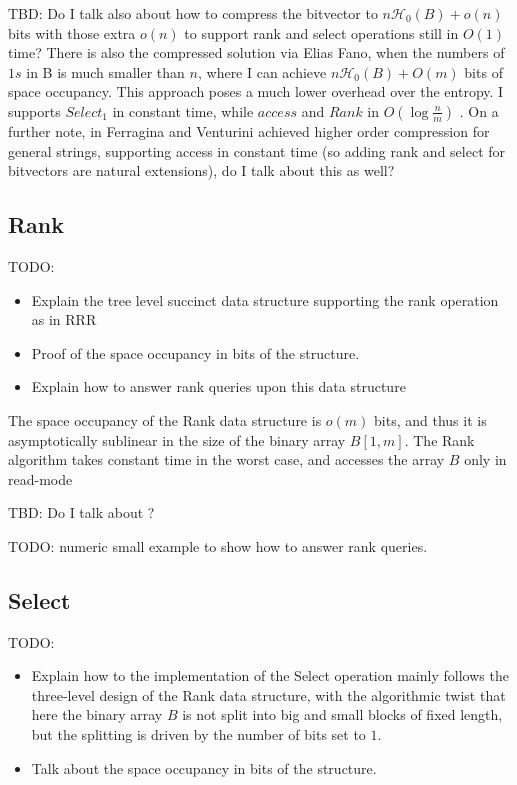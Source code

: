 \noindent TBD: Do I talk also about how to compress the bitvector to $n \mathcal{H}_0(B) + o(n)$ bits with those extra $o(n)$ to support rank and select operations still in $O(1)$ time? There is also the compressed solution via Elias Fano, when the numbers of $1s$ in B is much smaller than $n$, where I can achieve $n\mathcal{H}_0(B) + O(m)$ bits of space occupancy. This approach poses a much lower overhead over the entropy. I supports $Select_1$ in constant time, while $access$ and $Rank$ in $O(\log \frac{n}{m})$ \cite{navarro2016compact,ferragina2023pearls}. On a further note, in \cite{FERRAGINA2007115} Ferragina and Venturini achieved higher order compression for general strings, supporting access in constant time (so adding rank and select for bitvectors are natural extensions), do I talk about this as well?

\subsection{Rank}
TODO:
\begin{itemize}
    \item Explain the tree level succinct data structure supporting the rank operation as in RRR \cite{RRR2002}
    \item Proof of the space occupancy in bits of the structure. \cite{ferragina2023pearls}
    \item Explain how to answer rank queries upon this data structure \cite{ferragina2023pearls,navarro2016compact}
\end{itemize}
\begin{theorem}
    The space occupancy of the Rank data structure is $o(m)$ bits, and thus it is asymptotically sublinear in the size of the binary array $B[1, m]$. The Rank algorithm takes constant time in the worst case, and accesses the array $B$ only in read-mode
\end{theorem}
TBD: Do I talk about \cite{grossi2009haste}?
\begin{example}
    TODO: numeric small example to show how to answer rank queries.
\end{example}

\subsection{Select}
TODO:
\begin{itemize}
    \item Explain how to the implementation of the Select operation mainly follows the three-level design of the Rank data structure, with the algorithmic twist that here the binary array $B$ is not split into big and small blocks of fixed length, but the splitting is driven by the number of bits set to $1$. \cite{ferragina2023pearls,navarro2016compact}
    \item Talk about the space occupancy in bits of the structure. \cite{ferragina2023pearls,navarro2016compact}
\end{itemize}

